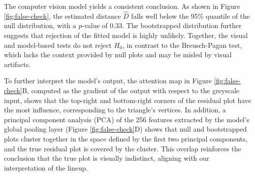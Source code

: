 \documentclass[]{interact}
\theoremstyle{plain}%
\theoremstyle{definition}
\theoremstyle{remark}
\begin{document}
The computer vision model yields a consistent conclusion. As shown in
Figure \ref{fig:false-check}, the estimated distance \(\hat{D}\) falls
well below the 95\% quantile of the null distribution, with a
\(p\)-value of \(0.33\). The bootstrapped distribution further suggests
that rejection of the fitted model is highly unlikely. Together, the
visual and model-based tests do not reject \(H_0\), in contrast to the
Breusch-Pagan test, which lacks the context provided by null plots and
may be misled by visual artifacts.

To further interpret the model's output, the attention map in Figure
\ref{fig:false-check}B, computed as the gradient of the output with
respect to the greyscale input, shows that the top-right and
bottom-right corners of the residual plot have the most influence,
corresponding to the triangle's vertices. In addition, a principal
component analysis (PCA) of the 256 features extracted by the model's
global pooling layer (Figure \ref{fig:false-check}D) shows that null and
bootstrapped plots cluster together in the space defined by the first
two principal components, and the true residual plot is covered by the
cluster. This overlap reinforces the conclusion that the true plot is
visually indistinct, aligning with our interpretation of the lineup.
\end{document}
